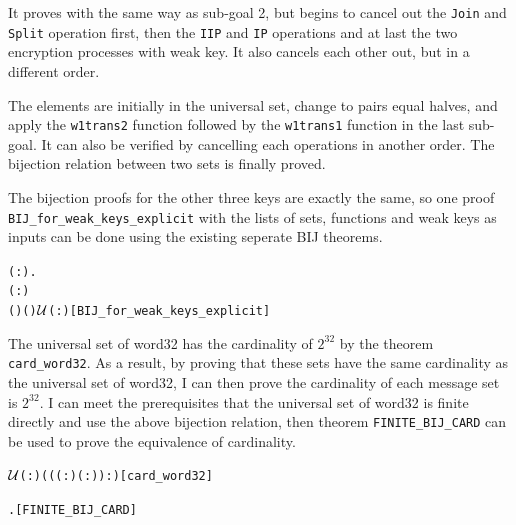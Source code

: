 \documentclass{article}
\begin{document}
It proves with the same way as sub-goal 2, but begins to cancel out the \verb|Join| and \verb|Split| operation first, then
the \verb|IIP| and \verb|IP| operations and at last the two encryption processes with weak key. It also cancels each other out,
but in a different order.

The elements are initially in the universal set, change to pairs equal halves, and apply the \verb|w1trans2| function followed
by the \verb|w1trans1| function in the last sub-goal. It can also be verified by cancelling each operations in another order.
The bijection relation between two sets is finally proved.

The bijection proofs for the other three keys are exactly the same, so one proof \verb|BIJ_for_weak_keys_explicit| with the lists of sets, functions and
weak keys as inputs can be done using the existing seperate BIJ theorems.

\begin{alltt}
\HOLTokenTurnstile{} \HOLSymConst{\HOLTokenForall{}}( :).
      \HOLSymConst{\HOLTokenLt{}} ( :) \HOLSymConst{\HOLTokenImp{}}
      (  ) (  ) \ensuremath{{\cal{U}}}(:)\hfill{[BIJ_for_weak_keys_explicit]}
\end{alltt}

The universal set of word32 has the cardinality of $2^{32}$ by the theorem \\
\verb|card_word32|. As a result, by proving that
these sets have the same cardinality as the universal set of word32, I can then prove the cardinality of each message set
is $2^{32}$. I can meet the prerequisites that the universal set of word32 is finite directly and use the above
bijection relation, then theorem \verb|FINITE_BIJ_CARD| can be used to prove the equivalence of cardinality.

\begin{alltt}
\HOLTokenTurnstile{}  \ensuremath{{\cal{U}}}(:) \HOLSymConst{=} ((( :) \HOLSymConst{\HOLTokenExp{}} ( :)) :)\hfill{[card_word32]}
\end{alltt}

\begin{alltt}
\HOLTokenTurnstile{} \HOLSymConst{\HOLTokenForall{}}  .   \HOLSymConst{\HOLTokenConj{}}     \HOLSymConst{\HOLTokenImp{}}   \HOLSymConst{=}  \hfill{[FINITE_BIJ_CARD]}
\end{alltt}
\end{document}
